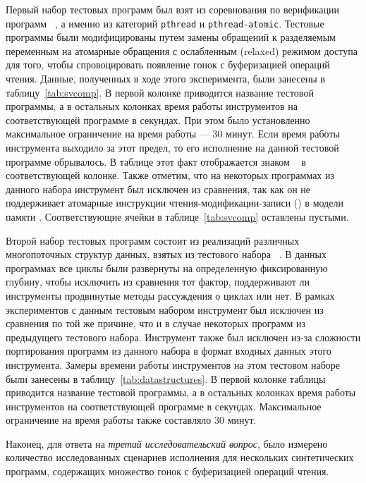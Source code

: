 Первый набор тестовых программ был взят 
из соревнования по верификации программ \SVCOMP~\cite{SVCOMP}, 
а именно из категорий \texttt{pthread} и \texttt{pthread-atomic}.
Тестовые программы были модифицированы путем замены 
обращений к разделяемым переменным на атомарные обращения 
с ослабленным (relaxed) режимом доступа 
для того, чтобы спровоцировать появление гонок с буферизацией операций чтения. 
Данные, полученных в ходе этого эксперимента, были занесены в таблицу~\ref{tab:svcomp}. 
В первой колонке приводится название тестовой программы, 
а в остальных колонках время работы инструментов 
на соответствующей программе в секундах.
При этом было установленно максимальное ограничение на время работы --- 30 минут.
Если время работы инструмента выходило за этот предел, 
то его исполнение на данной тестовой программе обрывалось. 
В таблице этот факт отображается знаком \timeoutNoSpc~
в соответствующей колонке.
Также отметим, что на некоторых программах из данного набора 
инструмент \Nidhugg был исключен из сравнения, так как он не поддерживает 
атомарные инструкции чтения-модификации-записи (\RMW) в модели памяти \POWER. 
Соответствующие ячейки в таблице~\ref{tab:svcomp} оставлены пустыми.



Второй набор тестовых программ состоит из 
реализаций различных многопоточных структур данных, 
взятых из тестового набора \CDSChecker~\cite{Norris-Demsky:OOPSLA2013}. 
В данных программах все циклы были развернуты 
на определенную фиксированную глубину, чтобы исключить из сравнения тот фактор, 
поддерживают ли инструменты продвинутые методы рассуждения о циклах или нет. 
В рамках экспериментов с данным тестовым набором инструмент \Nidhugg 
был исключен из сравнения по той же причине, что 
и в случае некоторых программ из предыдущего тестового набора. 
Инструмент \rmem также был исключен из-за сложности портирования 
программ из данного набора в формат входных данных этого инструмента.
Замеры времени работы инструментов на этом тестовом наборе 
были занесены в таблицу~\ref{tab:datastructures}. 
В первой колонке таблицы приводится название тестовой программы, 
а в остальных колонках время работы инструментов 
на соответствующей программе в секундах.
Максимальное ограничение на время работы также составляло 30 минут.



Наконец, для ответа на \emph{третий исследовательский вопрос}, 
было измерено количество исследованных \wmc 
сценариев исполнения для нескольких синтетических программ, 
содержащих множество гонок с буферизацией операций чтения. 

